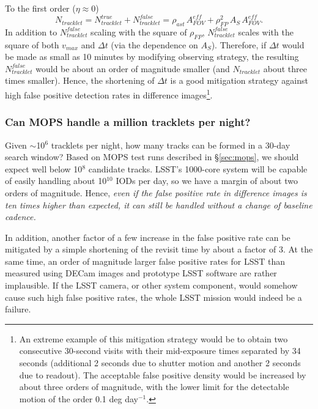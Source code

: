 To the first order ($\eta \approx 0$)
\begin{equation}
   N_{tracklet} =  N_{tracklet}^{true} + N_{tracklet}^{false} = \rho_{ast}  \, A_{FOV}^{eff} + \rho^2_{FP}  \, A_S \, A_{FOV}^{eff}. 
\end{equation}
In addition to $N_{tracklet}^{false}$ scaling with the square of $\rho_{FP}$, $N_{tracklet}^{false}$ scales with the square of
both $v_{max}$ and  $\Delta t$ (via the dependence on $A_S$). Therefore, if $\Delta t$ would be made
as small as 10 minutes by modifying observing strategy, the resulting $N_{tracklet}^{false}$ would be about an 
order of magnitude smaller (and $N_{tracklet}$ about three times smaller).  Hence, the shortening of $\Delta t$ is 
a good mitigation strategy against high false positive detection rates in difference images\footnote{An
extreme example of this mitigation strategy would be to obtain two consecutive 30-second visits with
their mid-exposure times separated 
by 34 seconds (additional 2 seconds due to shutter motion and another 2 seconds due to readout). 
The acceptable false positive density would be increased by about three orders of magnitude, with the
lower limit for the detectable motion of the order 0.1 deg day$^{-1}$.}. 


\subsubsection{Can MOPS handle a million tracklets per night?} 

Given $\sim$10$^6$ tracklets per night, how many tracks can be formed in a 30-day search window? 
Based on MOPS test runs described in \S\ref{sec:mops}, we should expect well below 10$^8$ candidate
tracks. LSST's 1000-core system will be capable of easily handling about 10$^{10}$ IODs per day, so we 
have a margin of about two orders of magnitude. Hence, {\it even if the false positive rate in difference images is 
ten times higher than expected, it can still be handled without a change of baseline cadence.}

In addition, another factor of a few increase in the false positive rate can be mitigated by a simple
shortening of the revisit time by about a factor of 3. At the same time, an order of magnitude 
larger false positive rates for LSST than measured using DECam images and prototype LSST software
are rather implausible. If the LSST camera, or other system component, would somehow
cause such high false positive rates, the whole LSST mission would indeed be a failure. 

